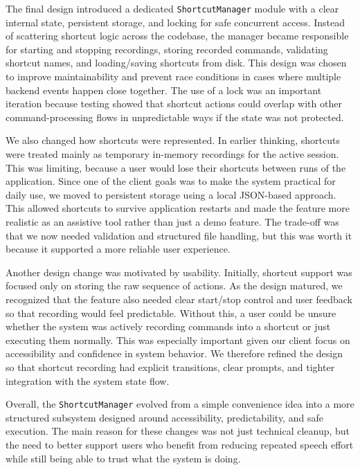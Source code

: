 \documentclass{article}
\begin{document}
The final design introduced a dedicated \texttt{ShortcutManager} module with a
clear internal state, persistent storage, and locking for safe concurrent
access. Instead of scattering shortcut logic across the codebase, the manager
became responsible for starting and stopping recordings, storing recorded
commands, validating shortcut names, and loading/saving shortcuts from disk.
This design was chosen to improve maintainability and prevent race conditions in
cases where multiple backend events happen close together. The use of a lock was
an important iteration because testing showed that shortcut actions could overlap
with other command-processing flows in unpredictable ways if the state was not
protected.

We also changed how shortcuts were represented. In earlier thinking, shortcuts
were treated mainly as temporary in-memory recordings for the active session.
This was limiting, because a user would lose their shortcuts between runs of the
application. Since one of the client goals was to make the system practical for
daily use, we moved to persistent storage using a local JSON-based approach.
This allowed shortcuts to survive application restarts and made the feature more
realistic as an assistive tool rather than just a demo feature. The trade-off
was that we now needed validation and structured file handling, but this was
worth it because it supported a more reliable user experience.

Another design change was motivated by usability. Initially, shortcut support was
focused only on storing the raw sequence of actions. As the design matured, we
recognized that the feature also needed clear start/stop control and user
feedback so that recording would feel predictable. Without this, a user could be
unsure whether the system was actively recording commands into a shortcut or just
executing them normally. This was especially important given our client focus on
accessibility and confidence in system behavior. We therefore refined the design
so that shortcut recording had explicit transitions, clear prompts, and tighter
integration with the system state flow.

Overall, the \texttt{ShortcutManager} evolved from a simple convenience idea
into a more structured subsystem designed around accessibility, predictability,
and safe execution. The main reason for these changes was not just technical
cleanup, but the need to better support users who benefit from reducing repeated
speech effort while still being able to trust what the system is doing.
\end{document}
